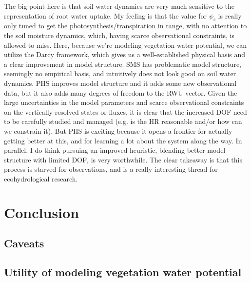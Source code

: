 \documentclass[draft,linenumbers]{agujournal}
\begin{document}
The big point here is that soil water dynamics are very much sensitive to the representation of root water uptake.
My feeling is that the value for $\psi_c$ is really only tuned to get the photosynthesis/transpiration in range, 
with no attention to the soil moisture dynamics, which, having scarce observational constraints, is allowed to miss.
Here, because we're modeling vegetation water potential, we can utilize the Darcy framework, which gives us a well-established physical basis and a clear improvement in model structure.
SMS has problematic model structure, seemingly no empirical basis, and intuitively does not look good on soil water dynamics.
PHS improves model structure and it adds some new observational data, but it also adds many degrees of freedom to the RWU vector. 
Given the large uncertainties in the model parameters and scarce observational constraints on the vertically-resolved states or fluxes, 
it is clear that the increased DOF need to be carefully studied and managed (e.g. is the HR reasonable and/or how can we constrain it).
But PHS is exciting because it opens a frontier for actually getting better at this, and for learning a lot about the system along the way.
In parallel, I do think pursuing an improved heuristic, blending better model structure with limited DOF, is very worthwhile.
The clear takeaway is that this process is starved for observations, and is a really interesting thread for ecohydrological research.

\section{Conclusion}

\subsection{Caveats}

\subsection{Utility of modeling vegetation water potential}

\clearpage    
\end{document}
